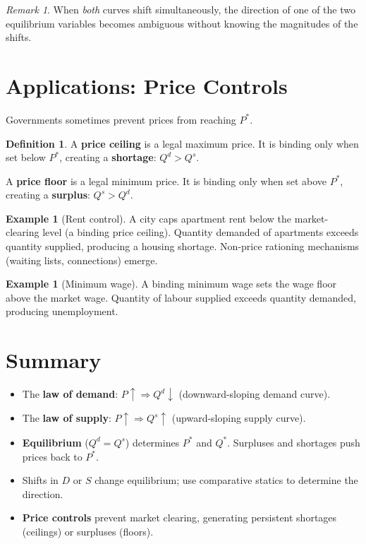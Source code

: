\documentclass[11pt]{article}
\theoremstyle{definition}
\newtheorem{definition}[theorem]{Definition}
\newtheorem{example}[theorem]{Example}
\theoremstyle{remark}
\newtheorem*{remark}{Remark}
\newcommand{\Qd}{Q^{d}}
\newcommand{\Qs}{Q^{s}}
\begin{document}
\begin{remark}
  When \textit{both} curves shift simultaneously, the direction of one of the
  two equilibrium variables becomes ambiguous without knowing the magnitudes of
  the shifts.
\end{remark}

\section{Applications: Price Controls}

Governments sometimes prevent prices from reaching $P^*$.

\begin{definition}
  A \textbf{price ceiling} is a legal maximum price.  It is binding only when
  set below $P^*$, creating a \textbf{shortage}: $\Qd > \Qs$.

  A \textbf{price floor} is a legal minimum price.  It is binding only when
  set above $P^*$, creating a \textbf{surplus}: $\Qs > \Qd$.
\end{definition}

\begin{example}[Rent control]
  A city caps apartment rent below the market-clearing level (a binding price
  ceiling).  Quantity demanded of apartments exceeds quantity supplied, producing
  a housing shortage.  Non-price rationing mechanisms (waiting lists, connections)
  emerge.
\end{example}

\begin{example}[Minimum wage]
  A binding minimum wage sets the wage floor above the market wage.
  Quantity of labour supplied exceeds quantity demanded, producing unemployment.
\end{example}

\section{Summary}

\begin{itemize}
  \item The \textbf{law of demand}: $P \uparrow \Rightarrow \Qd \downarrow$
    (downward-sloping demand curve).
  \item The \textbf{law of supply}: $P \uparrow \Rightarrow \Qs \uparrow$
    (upward-sloping supply curve).
  \item \textbf{Equilibrium} ($\Qd = \Qs$) determines $P^*$ and $Q^*$.
    Surpluses and shortages push prices back to $P^*$.
  \item Shifts in $D$ or $S$ change equilibrium; use comparative statics to
    determine the direction.
  \item \textbf{Price controls} prevent market clearing, generating persistent
    shortages (ceilings) or surpluses (floors).
\end{itemize}
\end{document}
